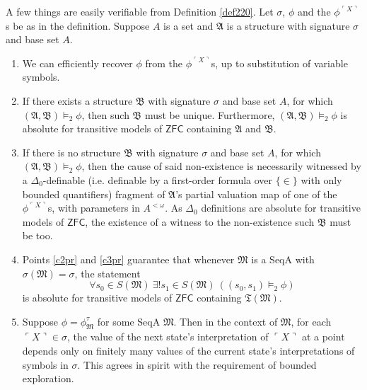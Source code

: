 \documentclass[12pt]{article}
\numberwithin{equation}{section}
\begin{document}
A few things are easily verifiable from Definition \ref{def220}. Let $\sigma$, $\phi$ and the $\phi^{\ulcorner X \urcorner}$s be as in the definition. Suppose $A$ is a set and $\mathfrak{A}$ is a structure with signature $\sigma$ and base set $A$.
\begin{enumerate}[label=(C\arabic*)]
    \item We can efficiently recover $\phi$ from the $\phi^{\ulcorner X \urcorner}$s, up to substitution of variable symbols.
    \item\label{c2pr} If there exists a structure $\mathfrak{B}$ with signature $\sigma$ and base set $A$, for which $(\mathfrak{A}, \mathfrak{B}) \models_2 \phi$, then such $\mathfrak{B}$ must be unique. Furthermore, $(\mathfrak{A}, \mathfrak{B}) \models_2 \phi$ is absolute for transitive models of $\mathsf{ZFC}$ containing $\mathfrak{A}$ and $\mathfrak{B}$.
    \item\label{c3pr} If there is no structure $\mathfrak{B}$ with signature $\sigma$ and base set $A$, for which $(\mathfrak{A}, \mathfrak{B}) \models_2 \phi$, then the cause of said non-existence is necessarily witnessed by a $\Delta_0$-definable (i.e. definable by a first-order formula over $\{\in\}$ with only bounded quantifiers) fragment of $\mathfrak{A}$'s partial valuation map of one of the $\phi^{\ulcorner X \urcorner}$s, with parameters in $A^{< \omega}$. As $\Delta_0$ definitions are absolute for transitive models of $\mathsf{ZFC}$, the existence of a witness to the non-existence such $\mathfrak{B}$ must be too.
    \item\label{c4pr} Points \ref{c2pr} and \ref{c3pr} guarantee that whenever $\mathfrak{M}$ is a SeqA with $\sigma(\mathfrak{M}) = \sigma$, the statement
    \begin{equation*}
        \forall s_0 \in S(\mathfrak{M}) \ \exists ! s_1 \in S(\mathfrak{M}) \ ((s_0, s_1) \models_2 \phi)
    \end{equation*}
    is absolute for transitive models of $\mathsf{ZFC}$ containing $\mathfrak{T}(\mathfrak{M})$.
    \item Suppose $\phi = \phi^{\tau}_{\mathfrak{M}}$ for some SeqA $\mathfrak{M}$. Then in the context of $\mathfrak{M}$, for each $\ulcorner X \urcorner \in \sigma$, the value of the next state's interpretation of $\ulcorner X \urcorner$ at a point depends only on finitely many values of the current state's interpretations of symbols in $\sigma$. This agrees in spirit with the requirement of bounded exploration.
\end{enumerate}
\end{document}
